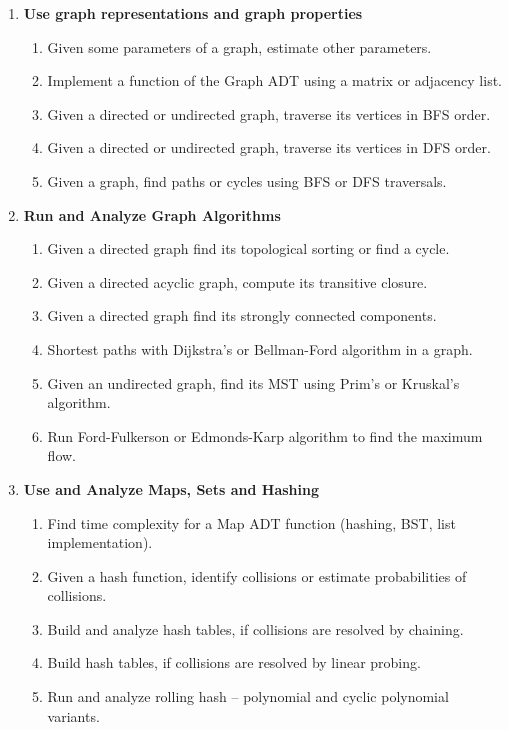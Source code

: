 \documentclass[a4paper,12pt]{article}
\begin{document}
{{\small
\begin{enumerate}
\item \textbf{Use graph representations and graph properties}
\begin{enumerate}[label=1.\Alph*.]
\item Given some parameters of a graph, estimate other parameters.
\item Implement a function of the Graph ADT using a matrix or adjacency list.
\item Given a directed or undirected graph, traverse its vertices in BFS order. 
\item Given a directed or undirected graph, traverse its vertices in DFS order. 
\item Given a graph, find paths or cycles using BFS or DFS traversals.
\end{enumerate}
\item \textbf{Run and Analyze Graph Algorithms}
\begin{enumerate}[label=2.\Alph*.]
\item Given a directed graph find its topological sorting or find a cycle.
\item Given a directed acyclic graph, compute its transitive closure.
\item Given a directed graph find its strongly connected components.
\item Shortest paths with Dijkstra's or Bellman-Ford algorithm in a graph.
\item Given an undirected graph, find its MST using Prim's or Kruskal's algorithm. 
\item Run Ford-Fulkerson or Edmonds-Karp algorithm to find the maximum flow.
\end{enumerate}
\item \textbf{Use and Analyze Maps, Sets and Hashing} 
\begin{enumerate}[label=3.\Alph*.]
\item Find time complexity for a Map ADT function (hashing, BST, list implementation).
\item Given a hash function, identify collisions or estimate probabilities of collisions.
\item Build and analyze hash tables, if collisions are resolved by chaining.
\item Build hash tables, if collisions are resolved by linear probing.
\item Run and analyze rolling hash -- polynomial and cyclic polynomial variants.
\end{enumerate}

\end{enumerate}}}
\end{document}
